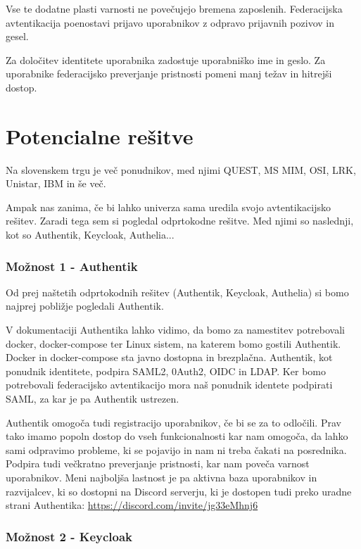 \documentclass[a4paper,12pt,openright]{book}
\begin{document}
{Vse te dodatne plasti varnosti ne povečujejo bremena zaposlenih. Federacijska avtentikacija poenostavi prijavo uporabnikov z odpravo prijavnih pozivov in gesel.

Za določitev identitete uporabnika zadostuje uporabniško ime in geslo. Za uporabnike federacijsko preverjanje pristnosti pomeni manj težav in hitrejši dostop.


\chapter{Potencialne rešitve}

Na slovenskem trgu je več ponudnikov, med njimi QUEST, MS MIM, OSI, LRK, Unistar, IBM in še več.

Ampak nas zanima, če bi lahko univerza sama uredila svojo avtentikacijsko rešitev. Zaradi tega sem si pogledal odprtokodne rešitve. Med njimi so naslednji, kot so Authentik, Keycloak, Authelia...


\subsection{Možnost 1 - Authentik}

Od prej naštetih odprtokodnih rešitev (Authentik, Keycloak, Authelia) si bomo najprej pobližje pogledali Authentik. 

V dokumentaciji Authentika\cite{AuthentikLink} lahko vidimo, da bomo za namestitev potrebovali docker, docker-compose ter Linux sistem, na katerem bomo gostili Authentik. Docker in docker-compose sta javno dostopna in brezplačna. 
\newline    
Authentik, kot ponudnik identitete, podpira SAML2, 0Auth2, OIDC in LDAP. Ker bomo potrebovali federacijsko avtentikacijo mora naš ponudnik identete podpirati SAML, za kar je pa Authentik ustrezen. 

Authentik omogoča tudi registracijo uporabnikov, če bi se za to odločili. Prav tako imamo popoln dostop do vseh funkcionalnosti kar nam omogoča, da lahko sami odpravimo probleme, ki se pojavijo in nam ni treba čakati na posrednika. Podpira tudi večkratno preverjanje pristnosti, kar nam poveča varnost uporabnikov. 
\newline    
Meni najboljša lastnost je pa aktivna baza uporabnikov in razvijalcev, ki so dostopni na Discord serverju, ki je dostopen tudi preko uradne strani Authentika: \url{https://discord.com/invite/jg33eMhnj6}

\subsection{Možnost 2 - Keycloak}

}
\end{document}
